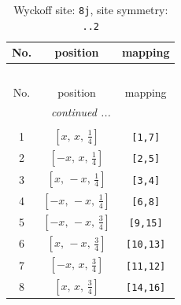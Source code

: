 \documentclass[fleqn,8pt]{jsarticle}
\begin{document}
\begin{longtable}{ccc}
\caption{Wyckoff site: {\tt 8j}, site symmetry: {\tt ..2}}
 \\
 \hline \hline
No. & position & mapping \\ \hline \endfirsthead

\multicolumn{2}{l}{\tablename\ \thetable{}} \\
 \hline \hline
No. & position & mapping \\ \hline \endhead

 \hline \hline
\multicolumn{2}{r}{\footnotesize\it continued ...} \\ \endfoot

 \hline \hline
\multicolumn{2}{r}{} \\ \endlastfoot

1 & $\left[ x,\, x,\, \frac{1}{4} \right]$ & {\tt [1,7]} \\ \hline
2 & $\left[ - x,\, x,\, \frac{1}{4} \right]$ & {\tt [2,5]} \\ \hline
3 & $\left[ x,\, - x,\, \frac{1}{4} \right]$ & {\tt [3,4]} \\ \hline
4 & $\left[ - x,\, - x,\, \frac{1}{4} \right]$ & {\tt [6,8]} \\ \hline
5 & $\left[ - x,\, - x,\, \frac{3}{4} \right]$ & {\tt [9,15]} \\ \hline
6 & $\left[ x,\, - x,\, \frac{3}{4} \right]$ & {\tt [10,13]} \\ \hline
7 & $\left[ - x,\, x,\, \frac{3}{4} \right]$ & {\tt [11,12]} \\ \hline
8 & $\left[ x,\, x,\, \frac{3}{4} \right]$ & {\tt [14,16]} \\
\end{longtable}
\renewcommand{\arraystretch}{1.2}
\end{document}

